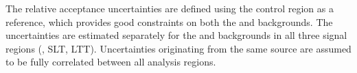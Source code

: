 



The relative acceptance uncertainties are defined using the \ZHF
control region as a reference, which provides good constraints on both
the \ZHF and \ttbar backgrounds. The uncertainties are estimated
separately for the \ZHF and \ttbar backgrounds in all three signal
regions (\hadhad, \lephad SLT, \lephad LTT). Uncertainties originating
from the same source are assumed to be fully correlated between all
analysis regions.

